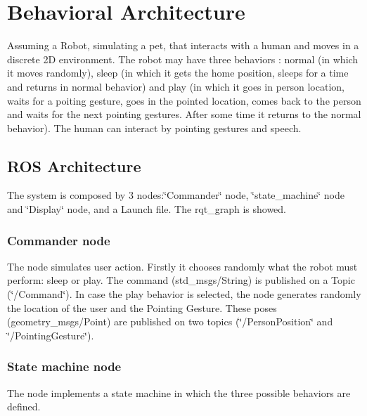\section*{Behavioral Architecture}

Assuming a Robot, simulating a pet, that interacts with a human and moves in a discrete 2D environment. The robot may have three behaviors \+: normal (in which it moves randomly), sleep (in which it gets the home position, sleeps for a time and returns in normal behavior) and play (in which it goes in person location, waits for a poiting gesture, goes in the pointed location, comes back to the person and waits for the next pointing gestures. After some time it returns to the normal behavior). The human can interact by pointing gestures and speech.

\subsection*{R\+OS Architecture}

The system is composed by 3 nodes\+:\char`\"{}\+Commander\char`\"{} node, \char`\"{}state\+\_\+machine\char`\"{} node and \char`\"{}\+Display\char`\"{} node, and a Launch file. The rqt\+\_\+graph is showed.

 

\subsubsection*{Commander node}

The node simulates user action. Firstly it chooses randomly what the robot must perform\+: sleep or play. The command (std\+\_\+msgs/\+String) is published on a Topic (\char`\"{}/\+Command\char`\"{}). In case the play behavior is selected, the node generates randomly the location of the user and the Pointing Gesture. These poses (geometry\+\_\+msgs/\+Point) are published on two topics (\char`\"{}/\+Person\+Position\char`\"{} and \char`\"{}/\+Pointing\+Gesture\char`\"{}).

\subsubsection*{State machine node}

The node implements a state machine in which the three possible behaviors are defined.

 

